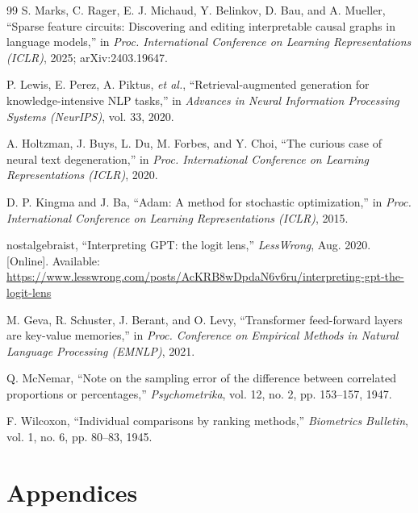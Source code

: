 \documentclass[12pt,a4paper]{report}
\begin{document}
\begin{thebibliography}{99}
 S. Marks, C. Rager, E. J. Michaud, Y. Belinkov, D. Bau, and A. Mueller, ``Sparse feature circuits: Discovering and editing interpretable causal graphs in language models,'' in \textit{Proc. International Conference on Learning Representations (ICLR)}, 2025; arXiv:2403.19647.

 P. Lewis, E. Perez, A. Piktus, \textit{et al.}, ``Retrieval-augmented generation for knowledge-intensive NLP tasks,'' in \textit{Advances in Neural Information Processing Systems (NeurIPS)}, vol. 33, 2020.

 A. Holtzman, J. Buys, L. Du, M. Forbes, and Y. Choi, ``The curious case of neural text degeneration,'' in \textit{Proc. International Conference on Learning Representations (ICLR)}, 2020.

 D. P. Kingma and J. Ba, ``Adam: A method for stochastic optimization,'' in \textit{Proc. International Conference on Learning Representations (ICLR)}, 2015.

 nostalgebraist, ``Interpreting GPT: the logit lens,'' \textit{LessWrong}, Aug. 2020. [Online]. Available: \url{https://www.lesswrong.com/posts/AcKRB8wDpdaN6v6ru/interpreting-gpt-the-logit-lens}

 M. Geva, R. Schuster, J. Berant, and O. Levy, ``Transformer feed-forward layers are key-value memories,'' in \textit{Proc. Conference on Empirical Methods in Natural Language Processing (EMNLP)}, 2021.

 Q. McNemar, ``Note on the sampling error of the difference between correlated proportions or percentages,'' \textit{Psychometrika}, vol. 12, no. 2, pp. 153--157, 1947.

 F. Wilcoxon, ``Individual comparisons by ranking methods,'' \textit{Biometrics Bulletin}, vol. 1, no. 6, pp. 80--83, 1945.
\end{thebibliography}


\clearpage
\chapter*{Appendices}
\setcounter{figure}{0}
\end{document}

